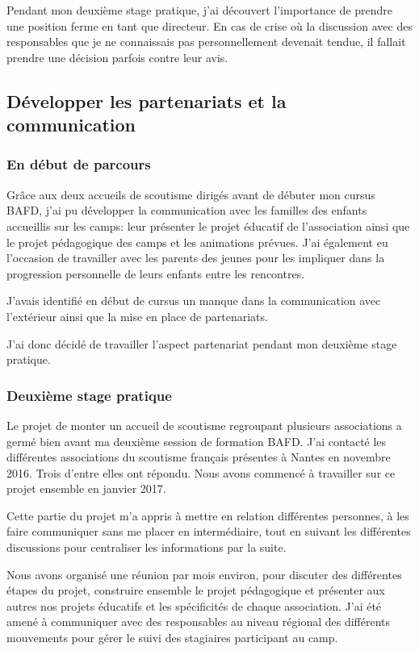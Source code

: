 \documentclass[titlepage,11pt,a4paper]{article}
\begin{document}
Pendant mon deuxième stage pratique, j'ai découvert l'importance de prendre une position
ferme en tant que directeur. En cas de crise où la discussion avec des responsables que je
ne connaissais pas personnellement devenait tendue, il fallait prendre une décision
parfois contre leur avis.

\subsection{Développer les partenariats et la communication}
\subsubsection{En début de parcours}

Grâce aux deux accueils de scoutisme dirigés avant de débuter mon cursus BAFD, j'ai
pu développer la communication avec les familles des enfants accueillis sur les camps:
leur présenter le projet éducatif de l'association ainsi que le projet pédagogique des
camps et les animations prévues. J'ai également eu l'occasion de travailler avec les parents des jeunes pour les impliquer
dans la progression personnelle de leurs enfants entre les rencontres.

J'avais identifié en début de cursus un manque dans la communication avec l'extérieur ainsi que la
mise en place de partenariats.

J'ai donc décidé de travailler l'aspect partenariat pendant mon deuxième stage pratique.

\subsubsection{Deuxième stage pratique}

Le projet de monter un accueil de scoutisme regroupant plusieurs associations a germé bien avant ma
deuxième session de formation BAFD\@. J'ai contacté les différentes associations du
scoutisme français présentes à Nantes en novembre 2016. Trois d'entre elles ont répondu.
Nous avons commencé à travailler sur ce projet ensemble en janvier 2017.

Cette partie du projet m'a appris à mettre en relation différentes personnes, à les faire
communiquer sans me placer en intermédiaire, tout en suivant les différentes discussions
pour centraliser les informations par la suite.

Nous avons organisé une réunion par mois environ, pour discuter des différentes étapes du
projet, construire ensemble le projet pédagogique et présenter aux autres nos projets
éducatifs et les spécificités de chaque association. J'ai été amené à communiquer avec des
responsables au niveau régional des différents mouvements pour gérer le suivi des
stagiaires participant au camp.
\end{document}
